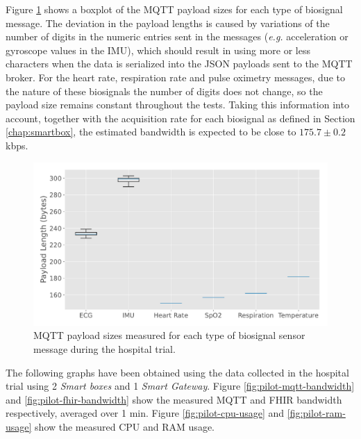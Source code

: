 Figure \ref{fig:labtest-mqtt-payload-sizes} shows a boxplot of the \acs{MQTT} payload sizes for each type of biosignal message. The deviation in the payload lengths is caused by variations of the number of digits in the numeric entries sent in the messages (\textit{e.g.} acceleration or gyroscope values in the \acs{IMU}), which should result in using more or less characters when the data is serialized into the \acs{JSON} payloads sent to the \acs{MQTT} broker. For the heart rate, respiration rate and pulse oximetry messages, due to the nature of these biosignals the number of digits does not change, so the payload size remains constant throughout the tests. Taking this information into account, together with the acquisition rate for each biosignal as defined in Section \ref{chap:smartbox}, the estimated bandwidth is expected to be close to {\color{blue}$ 175.7 \pm 0.2$} kbps.

\begin{figure}[H]
    \centering
    \includegraphics[width=0.85\linewidth]{images/labtest_mqtt_payload_sizes.pdf}
    \caption{\acs{MQTT} payload sizes measured for each type of biosignal sensor message during the hospital trial.}
    \label{fig:labtest-mqtt-payload-sizes}
\end{figure}

The following graphs have been obtained using the data collected in the hospital trial using 2 \textit{Smart boxes} and 1 \textit{Smart Gateway}. Figure \ref{fig:pilot-mqtt-bandwidth} and \ref{fig:pilot-fhir-bandwidth} show the measured \acs{MQTT} and \acs{FHIR} bandwidth respectively, averaged over 1 min.  Figure \ref{fig:pilot-cpu-usage} and \ref{fig:pilot-ram-usage} show the measured \acs{CPU} and \acs{RAM} usage.

